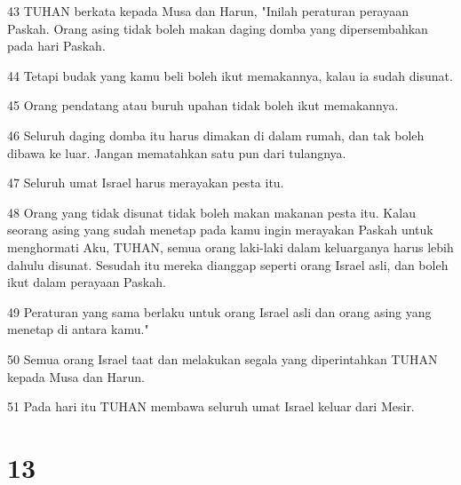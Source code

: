 \par 43 TUHAN berkata kepada Musa dan Harun, "Inilah peraturan perayaan Paskah. Orang asing tidak boleh makan daging domba yang dipersembahkan pada hari Paskah.
\par 44 Tetapi budak yang kamu beli boleh ikut memakannya, kalau ia sudah disunat.
\par 45 Orang pendatang atau buruh upahan tidak boleh ikut memakannya.
\par 46 Seluruh daging domba itu harus dimakan di dalam rumah, dan tak boleh dibawa ke luar. Jangan mematahkan satu pun dari tulangnya.
\par 47 Seluruh umat Israel harus merayakan pesta itu.
\par 48 Orang yang tidak disunat tidak boleh makan makanan pesta itu. Kalau seorang asing yang sudah menetap pada kamu ingin merayakan Paskah untuk menghormati Aku, TUHAN, semua orang laki-laki dalam keluarganya harus lebih dahulu disunat. Sesudah itu mereka dianggap seperti orang Israel asli, dan boleh ikut dalam perayaan Paskah.
\par 49 Peraturan yang sama berlaku untuk orang Israel asli dan orang asing yang menetap di antara kamu."
\par 50 Semua orang Israel taat dan melakukan segala yang diperintahkan TUHAN kepada Musa dan Harun.
\par 51 Pada hari itu TUHAN membawa seluruh umat Israel keluar dari Mesir.

\chapter{13}

